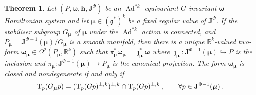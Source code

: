 \documentclass[11pt]{article}
\theoremstyle{plain}
\newtheorem{theorem}{Theorem}[section]
\theoremstyle{definition}
\newcommand{\T}{\mathrm{T}}
\newcommand{\bomega}{{\boldsymbol{\omega}}}
\newcommand{\bh}{{\boldsymbol{h}}}
\DeclareMathOperator{\Ad}{Ad}
\numberwithin{equation}{section}
\begin{document}
\begin{theorem}
\label{Th::BlackerReduction}Let $(P,\boldsymbol{\omega},\bh,\mathbf{J}^\Phi)$ be an $\Ad^{*k}$-equivariant $G$-invariant $\bomega$-Hamiltonian system and let $\bm\mu\in (\mathfrak{g}^*)^k$ be a fixed regular value of $\mathbf{J}^\Phi$. If the stabiliser subgroup $G_{\bm\mu}$ of $\bm\mu$ under the $\Ad^{*k}$ action is connected, and  $P_{\bm\mu}=\mathbf{J}^{\Phi-1}(\bm\mu)/G_{\bm\mu}$ is a smooth manifold, then there is a unique $\mathbb{R}^k$-valued two-form
$\bm\omega_{\bm\mu}\in \Omega^2(P_{\bm\mu},\mathbb{R}^k)$ such that
$\pi_{\bm\mu}^*\bomega_{\bm\mu}=\jmath^*_{\bm\mu}\bomega$ where $\jmath_{\bm\mu} : \mathbf{J}^{\Phi-1}
(\bm\mu)\hookrightarrow P$ is the inclusion and $\pi_{\bm\mu}:\mathbf{J}^{\Phi-1}
(\bm\mu) \rightarrow P_{\bm\mu}$ is the canonical projection. The form
$\bomega_{\bm\mu}$ is closed and nondegenerate if and only if 
\begin{equation}
\label{Eq::BlackerCondition}
\T_{p}(G_{\bm\mu}p)=(\T_{p}(Gp)^{\perp,k})^{\perp,k}\cap \T_{p}(Gp)^{\perp,k}\,,\qquad \forall p\in {\bf J}^{\Phi-1}({\bm \mu})\,.
\end{equation}
\end{theorem}
\end{document}
